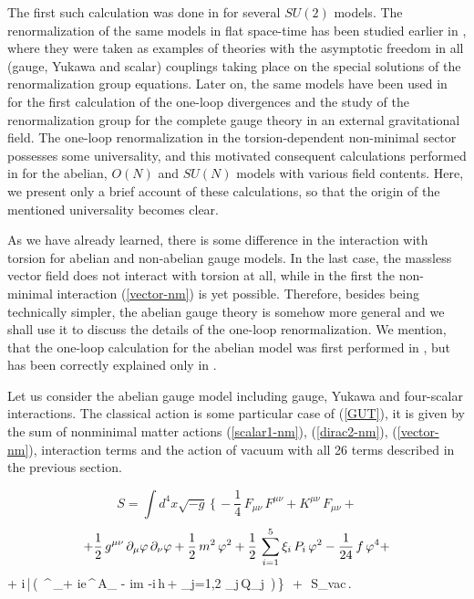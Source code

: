 The first such calculation was done in 
\cite{bush1,bush-Izv} for several $SU(2)$ models. The
renormalization of the same models in flat space-time has 
been studied earlier in \cite{votyu}, where they were taken
as examples of theories with the asymptotic freedom 
in all (gauge, Yukawa and scalar) couplings taking place
on the special solutions of the renormalization group 
equations. Later on, the same models have been used in 
\cite{buod} for the first calculation of the one-loop 
divergences and the study of the renormalization group for 
the complete gauge theory in an external gravitational field. 
The one-loop renormalization in the torsion-dependent
non-minimal sector \cite{bush1} possesses some universality, 
and this motivated consequent calculations performed in 
\cite{bush1,bush-Izv,bush2,sh-alexeev} for the abelian, 
$O(N)$ and $SU(N)$ 
models with various field contents. Here, we present only a 
brief account of these calculations, so that the origin of 
the mentioned universality becomes clear.

As we have already learned, there is some difference in the
interaction with torsion for abelian and non-abelian gauge 
models. In the last case, the massless vector field does not 
interact with torsion at all, while in the first the 
non-minimal interaction (\ref{vector-nm}) is yet possible. 
Therefore, besides being technically simpler,
the abelian gauge theory is somehow more general and we 
shall use it to discuss the details of the one-loop 
renormalization. We mention, that the one-loop calculation 
for the abelian model was first performed in \cite{obupon}, 
but has been correctly explained only in \cite{bush2}. 

Let us consider the abelian gauge model including gauge,
Yukawa and
four-scalar interactions. The classical action is 
some particular case of (\ref{GUT}), it is given by 
the sum of nonminimal matter actions 
(\ref{scalar1-nm}), (\ref{dirac2-nm}), (\ref{vector-nm}), 
interaction terms and the action of vacuum with all 
26 terms described in the previous section. 

$$
S=\int d^4x\sqrt{-g}\,\Big\{\,
-\frac14\,F_{\mu\nu}\,F^{\mu\nu} + K^{\mu\nu}\,F_{\mu\nu} +
$$
$$
+ \frac12\,g^{\mu\nu}\,\partial_\mu\varphi\,\partial_\nu\varphi
+ \frac12\,m^2\,\varphi^2 
+ \frac12\,\sum_{i=1}^{5}\xi_i\,P_i\,\varphi^2
- \frac{1}{24}\,f\,\varphi^4 +
$$
\beq
+ i\,{\bar \psi}\,\Big(\,
\ga^\al\,\na_\al + ie\,\ga^\al\,A_\al 
- im -i\,h\,\ph + \sum_{j=1,2} \eta_j\,Q_j 
\,\Big)\,\psi\Big\}\,\, + \,\,S_{vac}\,.
\label{abelian+action}
\eeq


